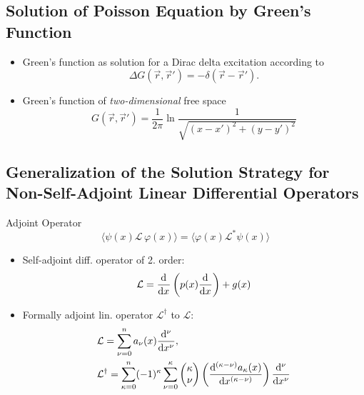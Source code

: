\subsection{Solution of Poisson Equation by Green's Function}
\begin{itemize}
  \item Green's function as solution for a Dirac delta excitation according to
        \begin{equation*}
          \Delta G(\vec{r},\vec{r}') = -\delta(\vec{r} - \vec{r}').
        \end{equation*}
  \item Green's function of \textit{two-dimensional} free space
        \begin{equation*}
          G(\vec{r},\vec{r}') = \dfrac{1}{2\pi}\ln\dfrac{1}{\sqrt{(x-x')^{2} + (y-y')^{2}}}
        \end{equation*}
\end{itemize}

\subsection{Generalization of the Solution Strategy for Non-Self-Adjoint Linear Differential Operators}
\begin{definition}{Adjoint Operator}
    \begin{equation*}
    \langle\psi(x)\mathcal{L}\,\varphi(x)\rangle = \langle\varphi(x)\mathcal{L}^{*}\psi(x)\rangle
    \end{equation*}
\end{definition}
\begin{itemize}
  \item Self-adjoint diff. operator of 2. order:
        \begin{equation*}
          \mathcal{L} = \dfrac{\mathrm{d}^{}}{\mathrm{d}x^{}}\left(p(x)\dfrac{\mathrm{d}^{}}{\mathrm{d}x^{}}\right) + g(x)
        \end{equation*}
  \item Formally adjoint lin. operator $\mathcal{L}^{\dagger}$ to $\mathcal{L}$:
        \begin{align*}
          &\mathcal{L} = \sum\limits^{n}_{\nu=0} a_{\nu}(x) \dfrac{\mathrm{d}^{\nu}}{\mathrm{d}x^{\nu}},\\
          &\mathcal{L}^{\dagger} = \sum\limits^{n}_{\kappa=0} (-1)^{\kappa} \sum\limits^{\kappa}_{\nu=0}
          \begin{pmatrix}\kappa\\ \nu\end{pmatrix}
          \left(\dfrac{\mathrm{d}^{(\kappa-\nu)}a_{\kappa}(x)}{\mathrm{d}x^{(\kappa-\nu)}}\right)
          \dfrac{\mathrm{d}^{\nu}}{\mathrm{d}x^{\nu}}
        \end{align*}
\end{itemize}

